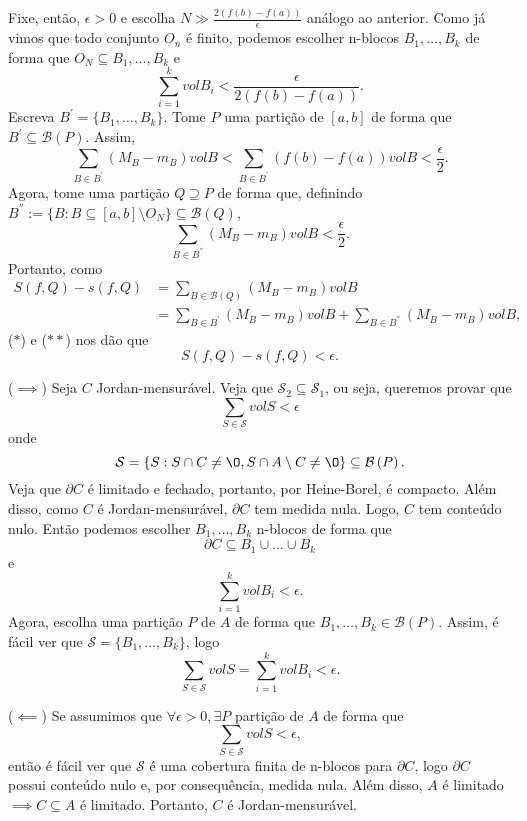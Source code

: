 \documentclass[a4paper]{report}
\begin{document}
Fixe, então, $\epsilon > 0$ e escolha $N\gg \frac{2\left(  f\left( b \right) -f\left( a \right) \right) }{\epsilon}$ análogo ao anterior. Como já vimos que todo conjunto $O_n$ é finito, podemos escolher n-blocos $B_1,\ldots,B_k$ de forma que $O_N\subseteq B_1,\ldots,B_k$ e \[
\sum_{i=1}^{k} vol B_i < \frac{\epsilon}{2\left(  f\left( b \right) - f\left( a \right) \right) }
.\] Escreva $B^{'} = \{ B_1, \ldots, B_k\}$. Tome $P$ uma partição de $\left[ a,b \right] $ de forma que $B^{'} \subseteq \mathcal{B}\left( P \right) $. Assim, \[
\sum_{B\in B^{'}} \left( M_B - m_B \right) vol B < \sum_{B \in B^{'}} \left( f\left( b \right) -f\left( a \right)  \right) vol B < \frac{\epsilon}{2} \tag{$*$}
.\] Agora, tome uma partição $Q \supseteq P$ de forma que, definindo $B^{''} := \{B : B \subseteq \left[ a,b \right] \setminus O_N\} \subseteq \mathcal{B}\left( Q \right)$, \[
\sum_{B\in B^{''}} \left( M_B - m_B \right) vol B < \frac{\epsilon}{2} \tag{$**$}
.\] Portanto, como
\begin{align*}
    S\left( f,Q \right) -s\left( f,Q \right) &= \sum_{B\in \mathcal{B}\left( Q \right) } \left( M_B - m_B \right) vol B \\
    &= \sum_{B\in B^{'}} \left( M_B - m_B \right) vol B + \sum_{B\in B^{''}} \left( M_B - m_B \right) vol B
,\end{align*}
($*$) e ($**$) nos dão que \[
S\left( f,Q \right) -s\left( f,Q \right) < \epsilon
.\] 



($\implies$)
Seja $C$ Jordan-mensurável. Veja que $\mathcal{S}_2 \subseteq \mathcal{S}_1$, ou seja, queremos provar que \[
\sum_{S\in \mathcal{S}} vol S < \epsilon
\] onde \[
\mathcal{S} = \{S : S\cap C \neq \O, S\cap A\setminus C \neq \O\} \subseteq \mathcal{B}\left( P \right) 
.\] Veja que $\partial C$ é limitado e fechado, portanto, por Heine-Borel, é compacto. Além disso, como $C$ é Jordan-mensurável, $\partial C$ tem medida nula. Logo, $C$ tem conteúdo nulo. Então podemos escolher $B_1,\ldots,B_k $ n-blocos de forma que \[
\partial C \subseteq B_1\cup \ldots\cup B_k
\] e \[
\sum_{i=1}^{k} vol B_i < \epsilon
.\] Agora, escolha uma partição $P$ de $A$ de forma que $B_1,\ldots,B_k \in \mathcal{B}\left( P \right) $. Assim, é fácil ver que $\mathcal{S} = \{B_1,\ldots,B_k\} $, logo \[
\sum_{S\in \mathcal{S}} vol S = \sum_{i=1}^{k} vol B_i < \epsilon
.\] 

($\impliedby$)
Se assumimos que $\forall \epsilon>0, \exists P$ partição de $A$ de forma que \[
\sum_{S\in \mathcal{S}} vol S < \epsilon
,\] então é fácil ver que $\mathcal{S}$ é uma cobertura finita de n-blocos para $\partial C$, logo $\partial C$ possui conteúdo nulo e, por consequência, medida nula. Além disso, $A$ é limitado $\implies C\subseteq A$ é limitado. Portanto, $C$ é Jordan-mensurável.
\end{document}
